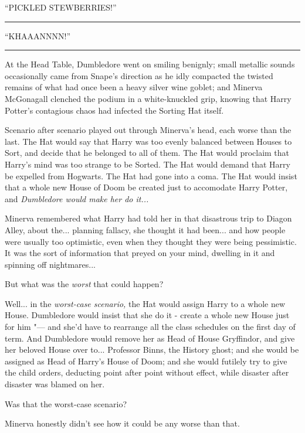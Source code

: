 ``PICKLED STEWBERRIES!''

\begin{center}\rule{3in}{0.4pt}\end{center}

``KHAAANNNN!''

\begin{center}\rule{3in}{0.4pt}\end{center}

At the Head Table, Dumbledore went on smiling benignly; small metallic
sounds occasionally came from Snape's direction as he idly compacted the
twisted remains of what had once been a heavy silver wine goblet; and
Minerva McGonagall clenched the podium in a white-knuckled grip, knowing
that Harry Potter's contagious chaos had infected the Sorting Hat
itself.

Scenario after scenario played out through Minerva's head, each worse
than the last. The Hat would say that Harry was too evenly balanced
between Houses to Sort, and decide that he belonged to all of them. The
Hat would proclaim that Harry's mind was too strange to be Sorted. The
Hat would demand that Harry be expelled from Hogwarts. The Hat had gone
into a coma. The Hat would insist that a whole new House of Doom be
created just to accomodate Harry Potter, and \emph{Dumbledore would make
her do it...}

Minerva remembered what Harry had told her in that disastrous trip to
Diagon Alley, about the... planning fallacy, she thought it had
been... and how people were usually too optimistic, even when they
thought they were being pessimistic. It was the sort of information that
preyed on your mind, dwelling in it and spinning off nightmares...

But what was the \emph{worst} that could happen?

Well... in the \emph{worst-case scenario,} the Hat would assign
Harry to a whole new House. Dumbledore would insist that she do it -
create a whole new House just for him "--- and she'd have to rearrange all
the class schedules on the first day of term. And Dumbledore would
remove her as Head of House Gryffindor, and give her beloved House over
to... Professor Binns, the History ghost; and she would be assigned
as Head of Harry's House of Doom; and she would futilely try to give the
child orders, deducting point after point without effect, while disaster
after disaster was blamed on her.

Was that the worst-case scenario?

Minerva honestly didn't see how it could be any worse than that.

